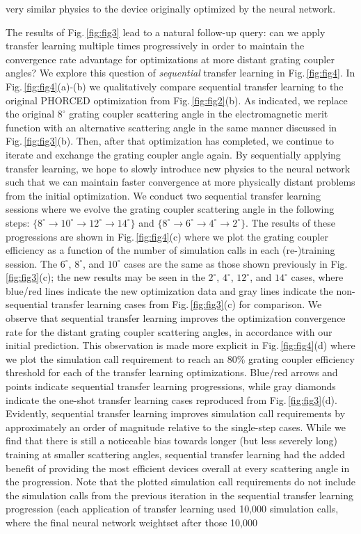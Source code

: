 \documentclass{article}
\begin{document}
very similar physics to the device originally optimized by the neural network.


The results of Fig.\,\ref{fig:fig3} lead to a natural follow-up query: can we apply transfer learning multiple times progressively in order to maintain the convergence rate advantage for optimizations at more distant grating coupler angles? We explore this question of \textit{sequential} transfer learning in Fig.\,\ref{fig:fig4}. In Fig.\,\ref{fig:fig4}(a)-(b) we qualitatively compare sequential transfer learning to the original PHORCED optimization from Fig.\,\ref{fig:fig2}(b). As indicated, we replace the original $8^\circ$ grating coupler scattering angle in the electromagnetic merit function with an alternative scattering angle in the same manner discussed in Fig.\,\ref{fig:fig3}(b). Then, after that optimization has completed, we continue to iterate and exchange the grating coupler angle again. By sequentially applying transfer learning, we hope to slowly introduce new physics to the neural network such that we can maintain faster convergence at more physically distant problems from the initial optimization. We conduct two sequential transfer learning sessions where we evolve the grating coupler scattering angle in the following steps: $\{8^\circ \rightarrow 10^\circ \rightarrow 12^\circ\rightarrow 14^\circ\}$ and $\{8^\circ \rightarrow 6^\circ \rightarrow 4^\circ \rightarrow 2^\circ\}$. The results of these progressions are shown in Fig.\,\ref{fig:fig4}(c) where we plot the grating coupler efficiency as a function of the number of simulation calls in each (re-)training session. The $6^\circ$, $8^\circ$, and $10^\circ$ cases are the same as those shown previously in Fig.\,\ref{fig:fig3}(c); the new results may be seen in the $2^\circ$, $4^\circ$, $12^\circ$, and $14^\circ$ cases, where blue/red lines indicate the new optimization data and gray lines indicate the non-sequential transfer learning cases from Fig.\,\ref{fig:fig3}(c) for comparison. We observe that sequential transfer learning improves the optimization convergence rate for the distant grating coupler scattering angles, in accordance with our initial prediction. This observation is made more explicit in Fig.\,\ref{fig:fig4}(d) where we plot the simulation call requirement to reach an 80\% grating coupler efficiency threshold for each of the transfer learning optimizations. Blue/red arrows and points indicate sequential transfer learning progressions, while gray diamonds indicate the one-shot transfer learning cases reproduced from Fig.\,\ref{fig:fig3}(d). Evidently, sequential transfer learning improves simulation call requirements by approximately an order of magnitude relative to the single-step cases. While we find that there is still a noticeable bias towards longer (but less severely long) training at smaller scattering angles, sequential transfer learning had the added benefit of providing the most efficient devices overall at every scattering angle in the progression. Note that the plotted simulation call requirements do not include the simulation calls from the previous iteration in the sequential transfer learning progression (each application of transfer learning used 10,000 simulation calls, where the final neural network weightset after those 10,000 
\end{document}
